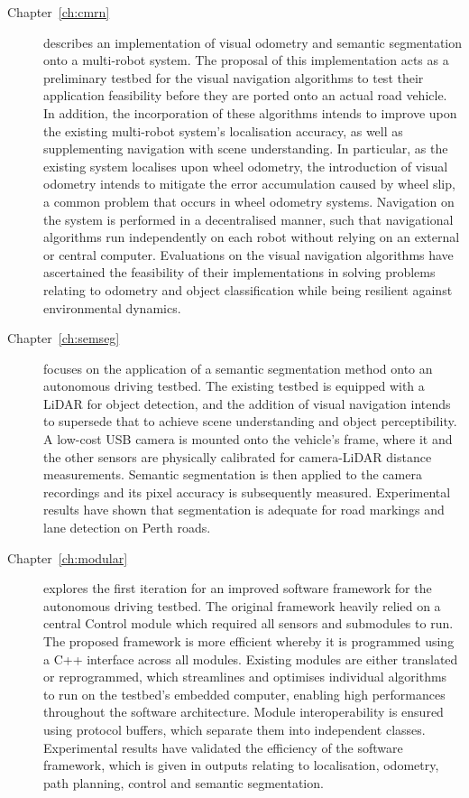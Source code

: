 \begin{description}
	\item[Chapter~\ref{ch:cmrn}] describes an implementation of visual odometry and semantic segmentation onto a multi-robot system. The proposal of this implementation acts as a preliminary testbed for the visual navigation algorithms to test their application feasibility before they are ported onto an actual road vehicle. In addition, the incorporation of these algorithms intends to improve upon the existing multi-robot system's localisation accuracy, as well as supplementing navigation with scene understanding. In particular, as the existing system localises upon wheel odometry, the introduction of visual odometry intends to mitigate the error accumulation caused by wheel slip, a common problem that occurs in wheel odometry systems. Navigation on the system is performed in a decentralised manner, such that navigational algorithms run independently on each robot without relying on an external or central computer. Evaluations on the visual navigation algorithms have ascertained the feasibility of their implementations in solving problems relating to odometry and object classification while being resilient against environmental dynamics. 
	\item [Chapter~\ref{ch:semseg}] focuses on the application of a semantic segmentation method onto an autonomous driving testbed. The existing testbed is equipped with a LiDAR for object detection, and the addition of visual navigation intends to supersede that to achieve scene understanding and object perceptibility. A low-cost USB camera is mounted onto the vehicle's frame, where it and the other sensors are physically calibrated for camera-LiDAR distance measurements. Semantic segmentation is then applied to the camera recordings and its pixel accuracy is subsequently measured. Experimental results have shown that segmentation is adequate for road markings and lane detection on Perth roads. 
	\item [Chapter~\ref{ch:modular}] explores the first iteration for an improved software framework for the autonomous driving testbed. The original framework heavily relied on a central Control module which required all sensors and submodules to run. The proposed framework is more efficient whereby it is programmed using a C++ interface across all modules. Existing modules are either translated or reprogrammed, which streamlines and optimises individual algorithms to run on the testbed's embedded computer, enabling high performances throughout the software architecture. Module interoperability is ensured using protocol buffers, which separate them into independent classes. Experimental results have validated the efficiency of the software framework, which is given in outputs relating to localisation, odometry, path planning, control and semantic segmentation. 

\end{description}
